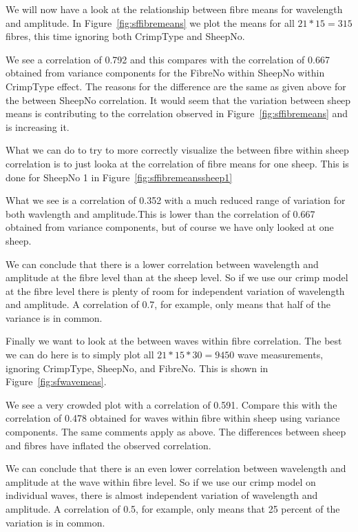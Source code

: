 \documentclass[titlepage,10pt]{article}  %
\begin{document}
We will now have a look at the relationship between fibre means for wavelength and amplitude. In Figure~\ref{fig:sffibremeans} we plot the means for all $21 * 15 = 315$ fibres, this time ignoring both CrimpType and SheepNo.

We see a correlation of 0.792 and this compares with the correlation of 0.667 obtained from variance components for the FibreNo within SheepNo within CrimpType effect.  The reasons for the difference are the same as given above for the between SheepNo correlation. It would seem that the variation between sheep means is contributing to the correlation observed in Figure~\ref{fig:sffibremeans} and is increasing it.

What we can do to try to more correctly visualize the between fibre within sheep correlation is to just looka at the correlation of fibre means for one sheep. This is done for SheepNo 1 in Figure~\ref{fig:sffibremeanssheep1}

What we see is a correlation of 0.352 with a much reduced range of variation for both wavlength and amplitude.This is lower than the correlation of 0.667 obtained from variance components, but of course we have only looked at one sheep. 

We can conclude that there is a lower correlation between wavelength and amplitude at the fibre level than at the sheep level. So if we use our crimp model at the fibre level there is plenty of room for independent variation of wavelength and amplitude. A correlation of 0.7, for example, only means that half of the variance is in common.

Finally we want to look at the between waves within fibre correlation. The best we can do here is to simply plot all $21 * 15 * 30 = 9450$ wave measurements, ignoring CrimpType, SheepNo, and FibreNo. This is shown in Figure~\ref{fig:sfwavemeas}.

We see a very crowded plot with a correlation of 0.591. Compare this with the correlation of 0.478 obtained for waves within fibre within sheep using variance components. The same comments apply as above. The differences between sheep and fibres have inflated the observed correlation.

We can conclude that there is an even lower correlation between wavelength and amplitude at the wave within fibre level. So if we use our crimp model on individual waves, there is almost independent variation of wavelength and amplitude. A correlation  of 0.5, for example, only means that 25 percent of the variation is in common.
\end{document}
